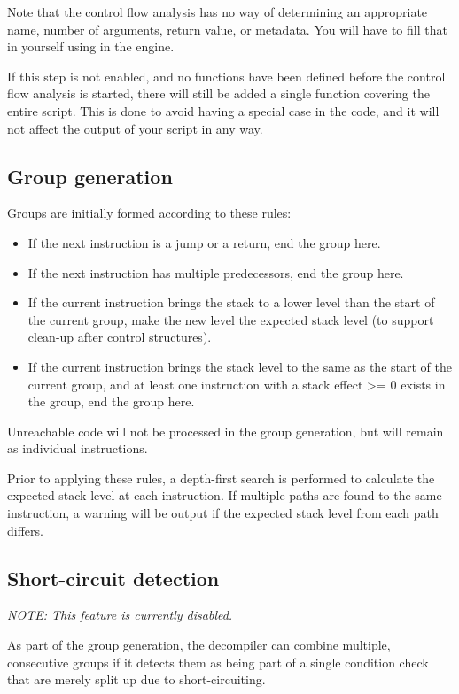 Note that the control flow analysis has no way of determining an appropriate name, number of arguments, return value, or metadata. You will have to fill that in yourself using  in the engine.

If this step is not enabled, and no functions have been defined before the control flow analysis is started, there will still be added a single function covering the entire script. This is done to avoid having a special case in the code, and it will not affect the output of your script in any way.

\subsection{Group generation}
Groups are initially formed according to these rules:
\begin{itemize}
\item If the next instruction is a jump or a return, end the group here.
\item If the next instruction has multiple predecessors, end the group here.
\item If the current instruction brings the stack to a lower level than the start of the current group, make the new level the expected stack level (to support clean-up after control structures).
\item If the current instruction brings the stack level to the same as the start of the current group, and at least one instruction with a stack effect >= 0 exists in the group, end the group here.
\end{itemize}

Unreachable code will not be processed in the group generation, but will remain as individual instructions.

Prior to applying these rules, a depth-first search is performed to calculate the expected stack level at each instruction. If multiple paths are found to the same instruction, a warning will be output if the expected stack level from each path differs.

\subsection{Short-circuit detection}
\emph{NOTE: This feature is currently disabled.}

As part of the group generation, the decompiler can combine multiple, consecutive groups if it detects them as being part of a single condition check that are merely split up due to short-circuiting.

